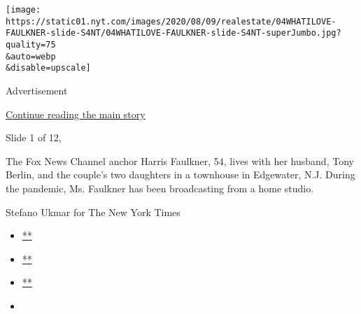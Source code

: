 \texttt{[image: https://static01.nyt.com/images/2020/08/09/realestate/04WHATILOVE-FAULKNER-slide-S4NT/04WHATILOVE-FAULKNER-slide-S4NT-superJumbo.jpg?quality=75\\\&auto=webp\\\&disable=upscale]}

Advertisement

\protect\hyperlink{after-right-0}{Continue reading the main story}

Slide 1 of 12,

The Fox News Channel anchor Harris Faulkner, 54, lives with her husband,
Tony Berlin, and the couple's two daughters in a townhouse in Edgewater,
N.J. During the pandemic, Ms. Faulkner has been broadcasting from a home
studio.

Stefano Ukmar for The New York Times

\begin{itemize}
\item
  \href{https://www.facebook.com/sharer.php?app_id=9869919170\&u=https\%3A\%2F\%2Fwww.nytimes.com\%2Fslideshow\%2F2020\%2F08\%2F04\%2Frealestate\%2Fthings-dont-have-to-be-matchy-matchy-and-other-design-tips-from-harris-faulkners-mom.html\%3Fsmid\%3Dfb-share\&name=\%E2\%80\%98Things\%20Don\%E2\%80\%99t\%20Have\%20to\%20Be\%20Matchy-Matchy\%E2\%80\%99\%20and\%20Other\%20Design\%20Tips\%20From\%20Harris\%20Faulkner\%E2\%80\%99s\%20Mom\&redirect_uri=https\%3A\%2F\%2Fwww.facebook.com\%2F}{**}
\item
  \href{https://twitter.com/intent/tweet?url=https\%3A\%2F\%2Fwww.nytimes.com\%2Fslideshow\%2F2020\%2F08\%2F04\%2Frealestate\%2Fthings-dont-have-to-be-matchy-matchy-and-other-design-tips-from-harris-faulkners-mom.html\%3Fsmid\%3Dtw-share\&text=\%E2\%80\%98Things\%20Don\%E2\%80\%99t\%20Have\%20to\%20Be\%20Matchy-Matchy\%E2\%80\%99\%20and\%20Other\%20Design\%20Tips\%20From\%20Harris\%20Faulkner\%E2\%80\%99s\%20Mom}{**}
\item
  \href{mailto:?subject=NYTimes.com\%3A\%20\%E2\%80\%98Things\%20Don\%E2\%80\%99t\%20Have\%20to\%20Be\%20Matchy-Matchy\%E2\%80\%99\%20and\%20Other\%20Design\%20Tips\%20From\%20Harris\%20Faulkner\%E2\%80\%99s\%20Mom\&body=From\%20The\%20New\%20York\%20Times\%3A\%0A\%0A\%E2\%80\%98Things\%20Don\%E2\%80\%99t\%20Have\%20to\%20Be\%20Matchy-Matchy\%E2\%80\%99\%20and\%20Other\%20Design\%20Tips\%20From\%20Harris\%20Faulkner\%E2\%80\%99s\%20Mom\%0A\%0AThe\%20Fox\%20News\%20anchor\%E2\%80\%99s\%20mother\%20gave\%20her\%20some\%20decorating\%20advice\%3A\%20\%E2\%80\%98Just\%20make\%20it\%20beautiful.\%E2\%80\%99\%20And\%20she\%E2\%80\%99s\%20been\%20trying.\%0A\%0Ahttps\%3A\%2F\%2Fwww.nytimes.com\%2Fslideshow\%2F2020\%2F08\%2F04\%2Frealestate\%2Fthings-dont-have-to-be-matchy-matchy-and-other-design-tips-from-harris-faulkners-mom.html\%3Fsmid\%3Dem-share}{**}
\item
\end{itemize}

